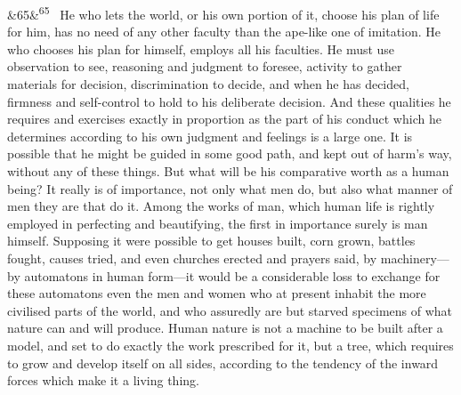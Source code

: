 \documentclass[12pt]{article}
\newcommand{\para}[1][]{\par\noindent\ifx&#1&\else\textsuperscript{\footnotesize #1}~\fi}
\begin{document}
\para[65] He who lets the world, or his own portion of it, choose his plan of life for him, has no need of any other faculty than the ape-like one of imitation. He who chooses his plan for himself, employs all his faculties. He must use observation to see, reasoning and judgment to foresee, activity to gather materials for decision, discrimination to decide, and when he has decided, firmness and self-control to hold to his deliberate decision. And these qualities he requires and exercises exactly in proportion as the part of his conduct which he determines according to his own judgment and feelings is a large one. It is possible that he might be guided in some good path, and kept out of harm's way, without any of these things. But what will be his comparative worth as a human being? It really is of importance, not only what men do, but also what manner of men they are that do it. Among the works of man, which human life is rightly employed in perfecting and beautifying, the first in importance surely is man himself. Supposing it were possible to get houses built, corn grown, battles fought, causes tried, and even churches erected and prayers said, by machinery---by automatons in human form---it would be a considerable loss to exchange for these automatons even the men and women who at present inhabit the more civilised parts of the world, and who assuredly are but starved specimens of what nature can and will produce. Human nature is not a machine to be built after a model, and set to do exactly the work prescribed for it, but a tree, which requires to grow and develop itself on all sides, according to the tendency of the inward forces which make it a living thing.
\end{document}
